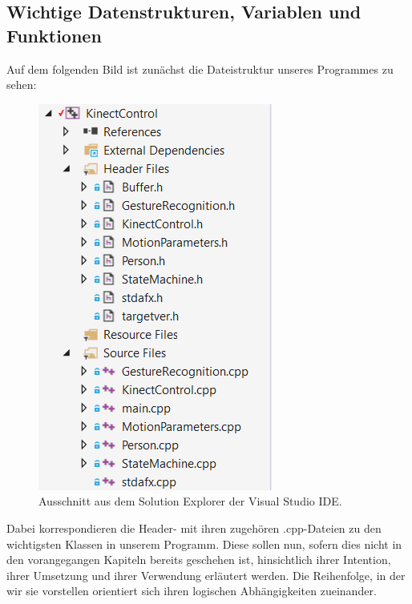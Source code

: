 	\subsection{Wichtige Datenstrukturen, Variablen und Funktionen}\label{sec:ds}
	Auf dem folgenden Bild ist zunächst die Dateistruktur unseres Programmes zu sehen:
	\begin{figure}[h]
	\centering
	\includegraphics[width=.4\textwidth]{pictures/structure.jpg}
	\caption{Ausschnitt aus dem Solution Explorer der Visual Studio IDE.}
	\end{figure}
	Dabei korrespondieren die Header- mit ihren zugehören .cpp-Dateien zu den wichtigsten Klassen in unserem Programm. Diese sollen nun, sofern dies nicht in den vorangegangen Kapiteln bereits geschehen ist, hinsichtlich ihrer Intention, ihrer Umsetzung und ihrer Verwendung erläutert werden. Die Reihenfolge, in der wir sie vorstellen orientiert sich ihren logischen Abhängigkeiten zueinander.\par\medskip

